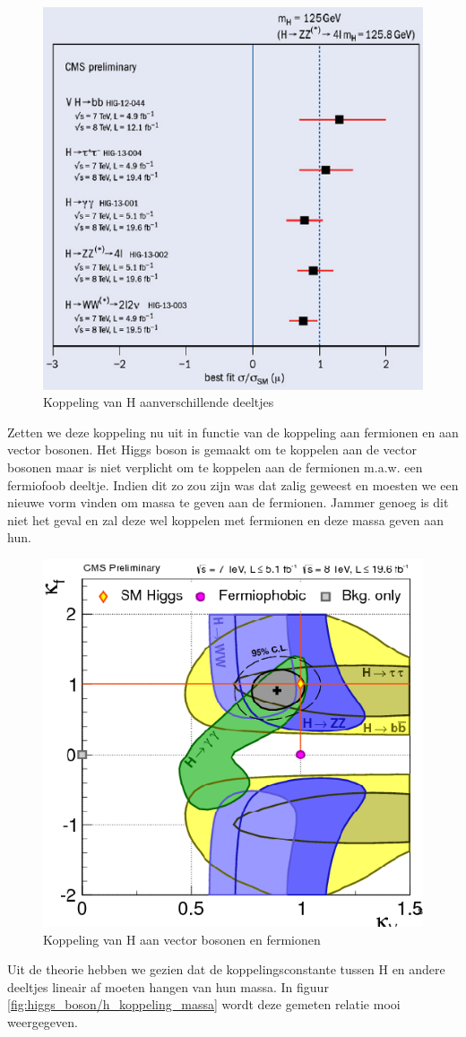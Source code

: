 \documentclass[../main.tex]{subfiles}
\begin{document}
\begin{figure}[h]
    \centering
    \includegraphics[width=0.5\linewidth]{higgs_boson/h_koppeling.png}
    \caption{Koppeling van H aanverschillende deeltjes}%
    \label{fig:higgs_boson/h_koppeling}
\end{figure}

Zetten we deze koppeling nu uit in functie van de koppeling aan fermionen en aan vector bosonen. Het Higgs boson is gemaakt om te koppelen aan de vector bosonen maar is niet verplicht om te koppelen aan de fermionen m.a.w. een fermiofoob deeltje. Indien dit zo zou zijn was dat zalig geweest en moesten we een nieuwe vorm vinden om massa te geven aan de fermionen. Jammer genoeg is dit niet het geval en zal deze wel koppelen met fermionen en deze massa geven aan hun.

\begin{figure}[h]
    \centering
    \includegraphics[width=0.5\linewidth]{higgs_boson/k_koppeling_vec_ferm.png}
    \caption{Koppeling van H aan vector bosonen en fermionen}%
    \label{fig:higgs_boson/k_koppeling_vec_ferm}
\end{figure}

Uit de theorie hebben we gezien dat de koppelingsconstante tussen H en andere deeltjes lineair af moeten hangen van hun massa. In figuur \ref{fig:higgs_boson/h_koppeling_massa} wordt deze gemeten relatie mooi weergegeven.
\end{document}
